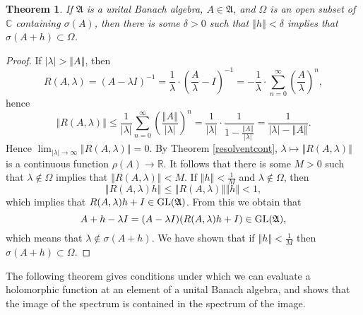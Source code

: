 \documentclass{article}
\newcommand{\GL}{\ensuremath\mathrm{GL}}
\newcommand{\norm}[1]{\left\Vert #1 \right\Vert}
\newtheorem{theorem}{Theorem}
\theoremstyle{definition}
\begin{document}
 \begin{theorem}
 If $\mathfrak{A}$ is a unital Banach algebra, $A \in \mathfrak{A}$, and $\Omega$ is an open subset of $\mathbb{C}$ containing
 $\sigma(A)$, then there is some $\delta>0$ such that $\norm{h}<\delta$ implies that $\sigma(A+h) \subset \Omega$.
 \end{theorem}
 \begin{proof}
 If $|\lambda|>\norm{A}$, then
\[
R(A,\lambda)=\left(A-\lambda I \right)^{-1}= \frac{1}{\lambda} \cdot \left(\frac{A}{\lambda}- I\right)^{-1}=-\frac{1}{\lambda} \cdot \sum_{n=0}^\infty \left( \frac{A}{\lambda} \right)^n,
\]
hence
\[
\norm{R(A,\lambda)} \leq \frac{1}{|\lambda|} \sum_{n=0}^\infty \left( \frac{\norm{A}}{|\lambda|} \right)^n=\frac{1}{|\lambda|} \cdot \frac{1}{1-\frac{\norm{A}}{|\lambda|}}
=\frac{1}{|\lambda|-\norm{A}}.
\]
Hence $\lim_{|\lambda| \to \infty} \norm{R(A,\lambda)}=0$.
By Theorem \ref{resolventcont}, $\lambda \mapsto \norm{R(A,\lambda)}$ is a continuous function $\rho(A) \to \mathbb{R}$. 
It follows that there is some $M>0$ such that $\lambda \not \in \Omega$ implies that $\norm{R(A,\lambda)}<M$.
If $\norm{h}<\frac{1}{M}$ and $\lambda \not \in \Omega$,
then
\[
\norm{R(A,\lambda)h} \leq \norm{R(A,\lambda)} \norm{h} < 1,
\]
which implies that $R(A,\lambda)h+I \in \GL(\mathfrak{A})$. 
From this we obtain that
\[
A+h-\lambda I=(A-\lambda I)(R(A,\lambda)h+I) \in \GL(\mathfrak{A}),
\]
which means that $\lambda \not \in \sigma(A+h)$. We have shown that if $\norm{h}<\frac{1}{M}$ then
$\sigma(A+h) \subset \Omega$.
 \end{proof}
 
  
The following theorem gives conditions under which we can evaluate a holomorphic function at an element of a unital Banach algebra, and shows
that the image of the spectrum is contained in the spectrum of the image.
\end{document}
